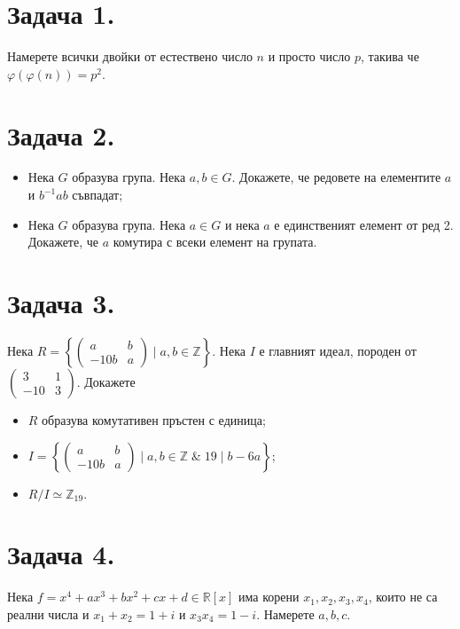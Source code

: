 \documentclass[17pt]{extarticle}
\begin{document}
\section*{Задача 1.}
Намерете всички двойки от естествено число \(n\) и просто число \(p\), такива че \(\varphi(\varphi(n)) = p^2\).
\section*{Задача 2.}
\begin{itemize}
    \item Нека \(G\) образува група. Нека \(a, b \in G\). Докажете, че редовете на елементите \(a\) и \(b^{-1}ab\) съвпадат;
    \item Нека \(G\) образува група. Нека \(a \in G\) и нека \(a\) е единственият елемент от ред 2. Докажете, че \(a\) комутира с всеки елемент на групата.
\end{itemize}
\section*{Задача 3.}
Нека \(R = \left\{ \begin{pmatrix}
    a & b \\
    -10b & a
\end{pmatrix} \mid a,b \in \mathbb Z \right\}\).
Нека \(I\) е главният идеал, породен от \(\begin{pmatrix}
    3 & 1 \\
    -10 & 3
\end{pmatrix}\).
Докажете
\begin{itemize}
    \item \(R\) образува комутативен пръстен с единица;
    \item \(I = \left\{ \begin{pmatrix}
    a & b \\
    -10b & a
\end{pmatrix} \mid a,b \in \mathbb Z \;\&\; 19 \mid b - 6a\right\}\);
    \item \(R / I \simeq \mathbb{Z}_{19}\).
\end{itemize}
\section*{Задача 4.}
Нека \(f = x^4 + ax^3 + bx^2 + cx + d \in \mathbb{R}[x]\)
има корени \(x_1, x_2, x_3, x_4\), които не са реални числа и
\(x_1 + x_2 = 1 + i\) и \(x_3x_4 = 1 - i\).
Намерете \(a, b, c\).
\end{document}
